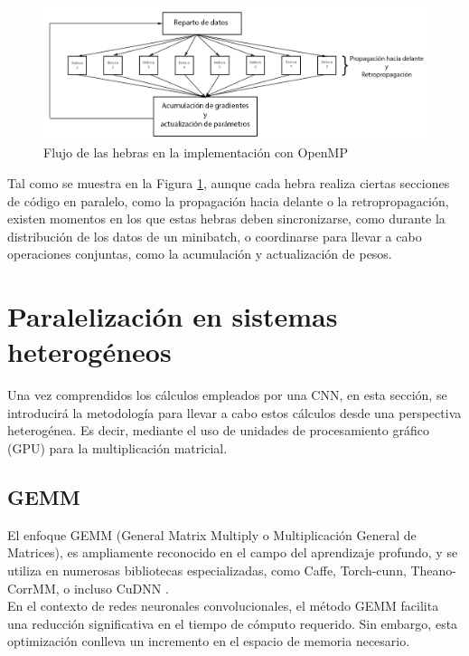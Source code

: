\begin{figure}[H]
	\centering
	\includegraphics[width=1.2\linewidth]{imagenes/openmp_flujo.jpg} 
	\caption{Flujo de las hebras en la implementación con OpenMP}
	\label{fig:openmp_flujo}
\end{figure}

Tal como se muestra en la Figura \ref{fig:openmp_flujo}, aunque cada hebra realiza ciertas secciones de código en paralelo, como la propagación hacia delante o la retropropagación, existen momentos en los que estas hebras deben sincronizarse, como durante la distribución de los datos de un minibatch, o coordinarse para llevar a cabo operaciones conjuntas, como la acumulación y actualización de pesos.


\section{Paralelización en sistemas heterogéneos}
Una vez comprendidos los cálculos empleados por una CNN, en esta sección, se introducirá la metodología para llevar a cabo estos cálculos desde una perspectiva heterogénea. Es decir, mediante el uso de unidades de procesamiento gráfico (GPU) para la multiplicación matricial.

\subsection{GEMM}

El enfoque GEMM \cite{GEMM_definition} (General Matrix Multiply o Multiplicación General de Matrices), es ampliamente reconocido en el campo del aprendizaje profundo, y se utiliza en numerosas bibliotecas especializadas, como Caffe, Torch-cunn, Theano-CorrMM, o incluso CuDNN \cite{conv_GEMM_FFT_comparacion}. \\
En el contexto de redes neuronales convolucionales, el método GEMM facilita una reducción significativa en el tiempo de cómputo requerido. Sin embargo, esta optimización conlleva un incremento en el espacio de memoria necesario. 

